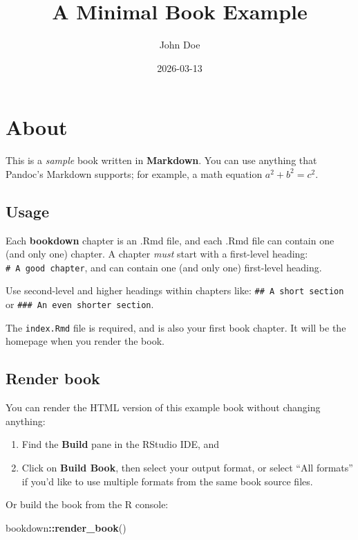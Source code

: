 \documentclass[
]{book}
\title{A Minimal Book Example}
\author{John Doe}
\date{2026-03-13}
\newenvironment{Shaded}{\begin{snugshade}}{\end{snugshade}}
\newcommand{\FunctionTok}[1]{\textcolor[rgb]{0.13,0.29,0.53}{\textbf{#1}}}
\newcommand{\NormalTok}[1]{#1}
\newcommand{\SpecialCharTok}[1]{\textcolor[rgb]{0.81,0.36,0.00}{\textbf{#1}}}
\theoremstyle{definition}
\theoremstyle{definition}
\theoremstyle{definition}
\theoremstyle{definition}
\theoremstyle{remark}
\begin{document}
\maketitle

{
\setcounter{tocdepth}{1}
\tableofcontents
}
\chapter{About}\label{about}

This is a \emph{sample} book written in \textbf{Markdown}. You can use anything that Pandoc's Markdown supports; for example, a math equation \(a^2 + b^2 = c^2\).

\section{Usage}\label{usage}

Each \textbf{bookdown} chapter is an .Rmd file, and each .Rmd file can contain one (and only one) chapter. A chapter \emph{must} start with a first-level heading: \texttt{\#\ A\ good\ chapter}, and can contain one (and only one) first-level heading.

Use second-level and higher headings within chapters like: \texttt{\#\#\ A\ short\ section} or \texttt{\#\#\#\ An\ even\ shorter\ section}.

The \texttt{index.Rmd} file is required, and is also your first book chapter. It will be the homepage when you render the book.

\section{Render book}\label{render-book}

You can render the HTML version of this example book without changing anything:

\begin{enumerate}
\def\labelenumi{\arabic{enumi}.}
\item
  Find the \textbf{Build} pane in the RStudio IDE, and
\item
  Click on \textbf{Build Book}, then select your output format, or select ``All formats'' if you'd like to use multiple formats from the same book source files.
\end{enumerate}

Or build the book from the R console:

\begin{Shaded}
\begin{Highlighting}[]
\NormalTok{bookdown}\SpecialCharTok{::}\FunctionTok{render\_book}\NormalTok{()}
\end{Highlighting}
\end{Shaded}
\end{document}
